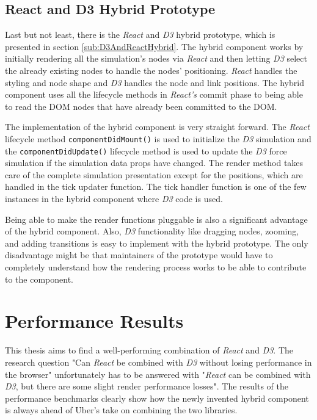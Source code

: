 \subsection{React and D3 Hybrid Prototype}

Last but not least, there is the \emph{React} and \emph{D3} hybrid prototype, which is presented in section \ref{sub:D3AndReactHybrid}. The hybrid component works by initially rendering all the simulation's nodes via \emph{React} and then letting \emph{D3} select the already existing nodes to handle the nodes' positioning. \emph{React} handles the styling and node shape and \emph{D3} handles the node and link positions. The hybrid component uses all the lifecycle methods in \emph{React's} commit phase to being able to read the DOM nodes that have already been committed to the DOM. 

The implementation of the hybrid component is very straight forward. The \emph{React} lifecycle method \texttt{componentDidMount()} is used to initialize the \emph{D3} simulation and the \texttt{componentDidUpdate()} lifecycle method is used to update the \emph{D3} force simulation if the simulation data props have changed. The render method takes care of the complete simulation presentation except for the positions, which are handled in the tick updater function. The tick handler function is one of the few instances in the hybrid component where \emph{D3} code is used.

Being able to make the render functions pluggable is also a significant advantage of the hybrid component. Also, \emph{D3} functionality like dragging nodes, zooming, and adding transitions is easy to implement with the hybrid prototype. The only disadvantage might be that maintainers of the prototype would have to completely understand how the rendering process works to be able to contribute to the component.

\section{Performance Results}

This thesis aims to find a well-performing combination of \emph{React} and \emph{D3}. The research question "Can \emph{React} be combined with \emph{D3} without losing performance in the browser" unfortunately has to be answered with "\emph{React} can be combined with \emph{D3}, but there are some slight render performance losses". The results of the performance benchmarks clearly show how the newly invented hybrid component is always ahead of Uber's take on combining the two libraries. 

